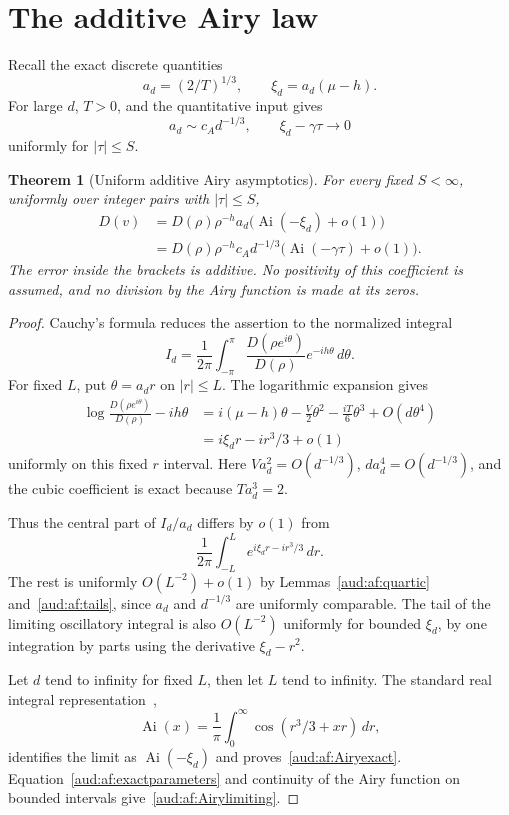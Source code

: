 \documentclass[11pt,a4paper]{article}
\numberwithin{equation}{section}
\newtheorem{theorem}{Theorem}[section]
\begin{document}
\section{The additive Airy law}
Recall the exact discrete quantities
\[
 a_d=(2/T)^{1/3},\qquad \xi_d=a_d(\mu-h).
\]
For large $d$, $T>0$, and the quantitative input gives
\begin{equation}\label{aud:af:exactparameters}
 a_d\sim c_A d^{-1/3},\qquad
 \xi_d-\gamma\tau\longrightarrow0
\end{equation}
uniformly for $|\tau|\le S$.

\begin{theorem}[Uniform additive Airy asymptotics]\label{aud:af:Airy}
For every fixed $S<\infty$, uniformly over integer pairs with $|\tau|\le S$,
\begin{align}
 [v^h]D(v)
 &=D(\rho)\rho^{-h}a_d\bigl(\operatorname{Ai}(-\xi_d)+o(1)\bigr)
 \label{aud:af:Airyexact}\\
 &=D(\rho)\rho^{-h}c_A d^{-1/3}
   \bigl(\operatorname{Ai}(-\gamma\tau)+o(1)\bigr).
 \label{aud:af:Airylimiting}
\end{align}
The error inside the brackets is additive. No positivity of this coefficient is assumed, and no division by the Airy function is made at its zeros.
\end{theorem}
\begin{proof}
Cauchy's formula reduces the assertion to the normalized integral
\[
 I_d=\frac1{2\pi}\int_{-\pi}^{\pi}
 \frac{D(\rho e^{i\theta})}{D(\rho)}e^{-ih\theta}\,d\theta.
\]
For fixed $L$, put $\theta=a_dr$ on $|r|\le L$. The logarithmic expansion gives
\begin{align*}
 \log\frac{D(\rho e^{i\theta})}{D(\rho)}-ih\theta
 &=i(\mu-h)\theta-\frac V2\theta^2-\frac{iT}6\theta^3
   +O(d\theta^4)\\
 &=i\xi_dr-ir^3/3+o(1)
\end{align*}
uniformly on this fixed $r$ interval. Here $Va_d^2=O(d^{-1/3})$, $da_d^4=O(d^{-1/3})$, and the cubic coefficient is exact because $Ta_d^3=2$.

Thus the central part of $I_d/a_d$ differs by $o(1)$ from
\[
 \frac1{2\pi}\int_{-L}^L e^{i\xi_dr-ir^3/3}\,dr.
\]
The rest is uniformly $O(L^{-2})+o(1)$ by Lemmas~\ref{aud:af:quartic} and~\ref{aud:af:tails}, since $a_d$ and $d^{-1/3}$ are uniformly comparable. The tail of the limiting oscillatory integral is also $O(L^{-2})$ uniformly for bounded $\xi_d$, by one integration by parts using the derivative $\xi_d-r^2$.

Let $d$ tend to infinity for fixed $L$, then let $L$ tend to infinity. The standard real integral representation~\cite[Eq.~9.5.1]{dlmf-airy},
\[
 \operatorname{Ai}(x)=\frac1\pi\int_0^\infty
       \cos(r^3/3+xr)\,dr,
\]
identifies the limit as $\operatorname{Ai}(-\xi_d)$ and proves~\eqref{aud:af:Airyexact}. Equation~\eqref{aud:af:exactparameters} and continuity of the Airy function on bounded intervals give~\eqref{aud:af:Airylimiting}.
\end{proof}
\end{document}
